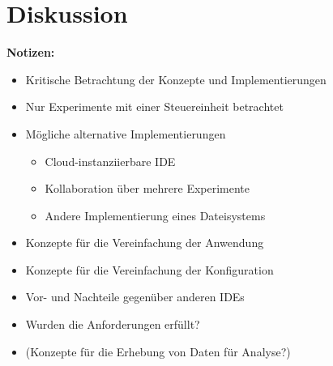 \chapter{Diskussion}\label{section:diskussion}

\begin{note}
    \textbf{Notizen:}
    \begin{itemize}
        \item Kritische Betrachtung der Konzepte und Implementierungen
        \item Nur Experimente mit einer Steuereinheit betrachtet
        \item Mögliche alternative Implementierungen
              \begin{itemize}
                  \item Cloud-instanziierbare IDE
                  \item Kollaboration über mehrere Experimente
                  \item Andere Implementierung eines Dateisystems
              \end{itemize}
        \item Konzepte für die Vereinfachung der Anwendung
        \item Konzepte für die Vereinfachung der Konfiguration
        \item Vor- und Nachteile gegenüber anderen IDEs
        \item Wurden die Anforderungen erfüllt?
        \item (Konzepte für die Erhebung von Daten für Analyse?)
    \end{itemize}
\end{note}